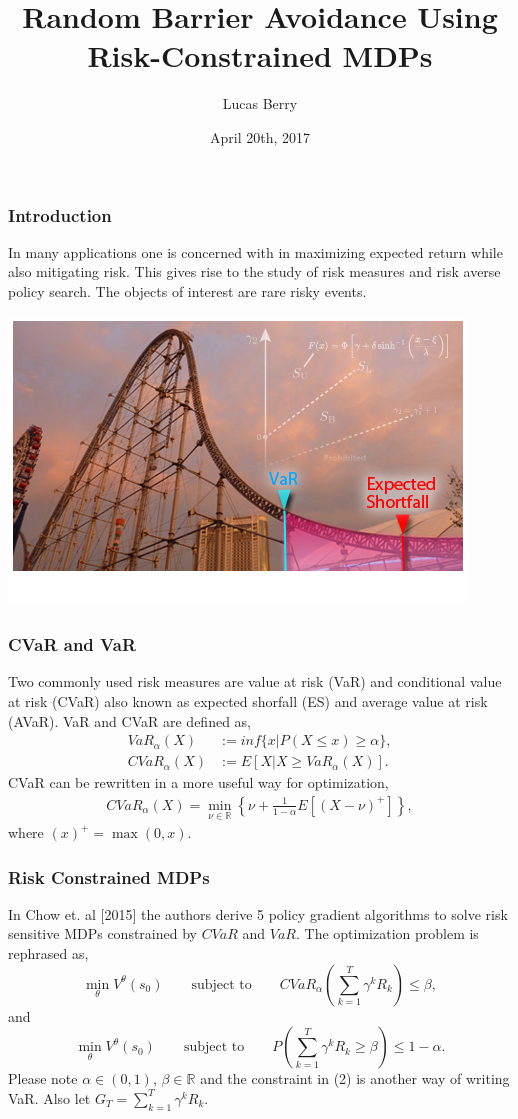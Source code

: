 \documentclass{beamer}
\title{Random Barrier Avoidance Using Risk-Constrained MDPs}
\author{Lucas Berry}
\institute{Comp 767}
\date{April 20th, 2017}
\begin{document}
\maketitle
\begin{frame}
	\frametitle{Introduction}
	In many applications one is concerned with in maximizing expected return while also mitigating risk. This gives rise to the study of risk measures and risk averse policy search. The objects of interest are rare risky events.
	\pause
	\begin{center}
	\includegraphics[scale=.4]{expected-shortfall}     
	\end{center}	
\end{frame}
\begin{frame}
	\frametitle{CVaR and VaR}
	Two commonly used risk measures are value at risk (VaR) and conditional value at risk (CVaR) also known as expected shorfall (ES) and average value at risk (AVaR). VaR and CVaR are defined as,
	\begin{align*}
		VaR_{\alpha}(X) &:= inf\lbrace{x | P(X\leq x)\geq\alpha\rbrace},\\
		CVaR_{\alpha}(X) &:= E\left[X|X\geq VaR_{\alpha}(X)\right]. 
	\end{align*}
	\pause
	CVaR can be rewritten in a more useful way for optimization,
	\begin{align*}
	CVaR_{\alpha}(X) = \min_{\nu \in \mathbb{R}}\left\lbrace \nu + \frac{1}{1-\alpha}E\left[(X-\nu)^+\right]\right\rbrace,
	\end{align*}
	where $(x)^+ = \max(0,x)$.  
\end{frame}
\begin{frame}
	\frametitle{Risk Constrained MDPs}
	In Chow et. al [2015] the authors derive 5 policy gradient algorithms to solve risk sensitive MDPs constrained by $CVaR$ and $VaR$. The optimization problem is rephrased as,
	\begin{displaymath}
		\min_{\theta} V^{\theta}(s_0) \qquad \text{subject to} \qquad CVaR_{\alpha}(\sum_{k=1}^{T}\gamma^kR_k)\leq \beta,
	\end{displaymath}
	\pause
	and
	\begin{displaymath}
		\min_{\theta} V^{\theta}(s_0) \qquad \text{subject to} \qquad P(\sum_{k=1}^{T}\gamma^kR_k\geq\beta)\leq 1-\alpha.
	\end{displaymath}
	Please note $\alpha \in (0,1)$, $\beta \in \mathbb{R}$ and the constraint in (2) is another way of writing VaR. Also let $G_T=\sum_{k=1}^{T}\gamma^kR_k$. 
\end{frame}
\end{document}
